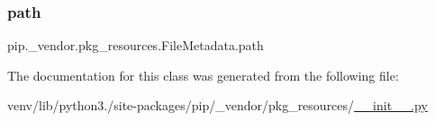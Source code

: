 \subsubsection{\texorpdfstring{path}{path}}
{\footnotesize\ttfamily pip.\+\_\+vendor.\+pkg\+\_\+resources.\+File\+Metadata.\+path}



The documentation for this class was generated from the following file\+:\begin{DoxyCompactItemize}
\item 
venv/lib/python3./site-\/packages/pip/\+\_\+vendor/pkg\+\_\+resources/\hyperlink{venv_2lib_2python3_89_2site-packages_2pip_2__vendor_2pkg__resources_2____init_____8py}{\+\_\+\+\_\+init\+\_\+\+\_\+.\+py}\end{DoxyCompactItemize}

